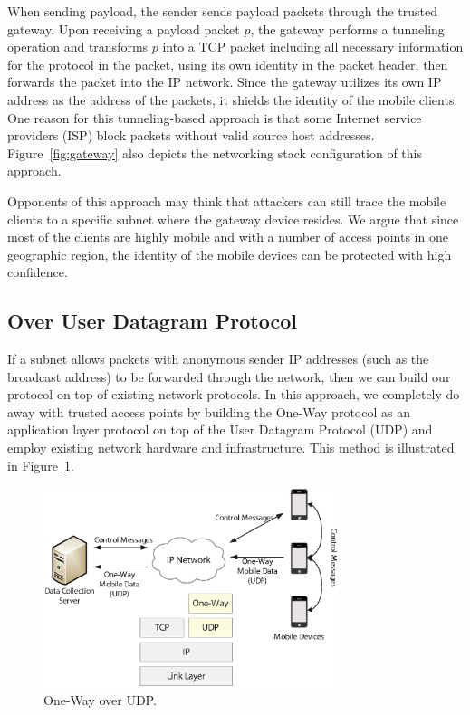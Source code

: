 When sending payload, the sender sends payload packets through the
trusted gateway. Upon receiving a payload packet $p$, the gateway
performs a tunneling operation and transforms $p$  into a TCP
packet including all necessary information for the protocol in the
packet, using its own identity in the packet header, then forwards
the packet into the IP network. Since the gateway utilizes its own
IP address as the address of the packets, it shields the identity
of the mobile clients. One reason for this tunneling-based
approach is that some Internet service providers (ISP) block
packets without valid source host addresses.
Figure~\ref{fig:gateway} also depicts the networking stack
configuration of this approach.

Opponents of this approach may think that attackers can still
trace the mobile clients to a specific subnet where the gateway
device resides. We argue that since most of the clients are highly
mobile and with a number of access points in one geographic
region, the identity of the mobile devices can be protected with
high confidence.

\subsection{Over User Datagram Protocol}

If a subnet allows packets with anonymous sender IP addresses
(such as the broadcast address) to be forwarded through the
network, then we can build our protocol on top of existing network
protocols. In this approach, we completely do away with trusted
access points by building the One-Way protocol as an application
layer protocol on top of the User Datagram Protocol (UDP) and
employ existing network hardware and infrastructure. This method
is illustrated in Figure~\ref{fig:imp-udp}.

\begin{figure}[h]
\begin{center}
\includegraphics[width=3.4in]{one-way-udp.eps}
\caption{One-Way over UDP.} \label{fig:imp-udp}
\end{center}
\end{figure}

